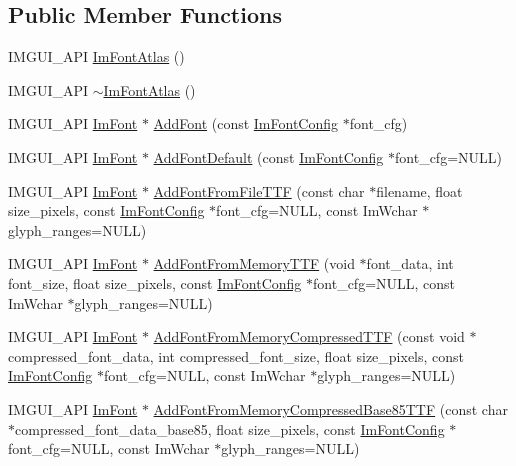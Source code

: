 \subsection*{Public Member Functions}
\begin{DoxyCompactItemize}
\item 
I\+M\+G\+U\+I\+\_\+\+A\+PI \hyperlink{struct_im_font_atlas_aa34e7909d30440d5c35aaef990ac741e}{Im\+Font\+Atlas} ()
\item 
I\+M\+G\+U\+I\+\_\+\+A\+PI \hyperlink{struct_im_font_atlas_a950b4f7586ad7786ae251b957d67a268}{$\sim$\+Im\+Font\+Atlas} ()
\item 
I\+M\+G\+U\+I\+\_\+\+A\+PI \hyperlink{struct_im_font}{Im\+Font} $\ast$ \hyperlink{struct_im_font_atlas_ad01c0f19a95d37a9e5ebab1e54525625}{Add\+Font} (const \hyperlink{struct_im_font_config}{Im\+Font\+Config} $\ast$font\+\_\+cfg)
\item 
I\+M\+G\+U\+I\+\_\+\+A\+PI \hyperlink{struct_im_font}{Im\+Font} $\ast$ \hyperlink{struct_im_font_atlas_a9d2b4a94579bf603a0d2662cd8348cbd}{Add\+Font\+Default} (const \hyperlink{struct_im_font_config}{Im\+Font\+Config} $\ast$font\+\_\+cfg=N\+U\+LL)
\item 
I\+M\+G\+U\+I\+\_\+\+A\+PI \hyperlink{struct_im_font}{Im\+Font} $\ast$ \hyperlink{struct_im_font_atlas_a26d0333bae95222ca2c2fd2886eae562}{Add\+Font\+From\+File\+T\+TF} (const char $\ast$filename, float size\+\_\+pixels, const \hyperlink{struct_im_font_config}{Im\+Font\+Config} $\ast$font\+\_\+cfg=N\+U\+LL, const Im\+Wchar $\ast$glyph\+\_\+ranges=N\+U\+LL)
\item 
I\+M\+G\+U\+I\+\_\+\+A\+PI \hyperlink{struct_im_font}{Im\+Font} $\ast$ \hyperlink{struct_im_font_atlas_adb01397920998a18e25bd8fed3f791a7}{Add\+Font\+From\+Memory\+T\+TF} (void $\ast$font\+\_\+data, int font\+\_\+size, float size\+\_\+pixels, const \hyperlink{struct_im_font_config}{Im\+Font\+Config} $\ast$font\+\_\+cfg=N\+U\+LL, const Im\+Wchar $\ast$glyph\+\_\+ranges=N\+U\+LL)
\item 
I\+M\+G\+U\+I\+\_\+\+A\+PI \hyperlink{struct_im_font}{Im\+Font} $\ast$ \hyperlink{struct_im_font_atlas_a579bb434bd116ea9ac4f892652ccefdb}{Add\+Font\+From\+Memory\+Compressed\+T\+TF} (const void $\ast$compressed\+\_\+font\+\_\+data, int compressed\+\_\+font\+\_\+size, float size\+\_\+pixels, const \hyperlink{struct_im_font_config}{Im\+Font\+Config} $\ast$font\+\_\+cfg=N\+U\+LL, const Im\+Wchar $\ast$glyph\+\_\+ranges=N\+U\+LL)
\item 
I\+M\+G\+U\+I\+\_\+\+A\+PI \hyperlink{struct_im_font}{Im\+Font} $\ast$ \hyperlink{struct_im_font_atlas_ab43b930beb57c0b998f42f4586677956}{Add\+Font\+From\+Memory\+Compressed\+Base85\+T\+TF} (const char $\ast$compressed\+\_\+font\+\_\+data\+\_\+base85, float size\+\_\+pixels, const \hyperlink{struct_im_font_config}{Im\+Font\+Config} $\ast$font\+\_\+cfg=N\+U\+LL, const Im\+Wchar $\ast$glyph\+\_\+ranges=N\+U\+LL)

\end{DoxyCompactItemize}
